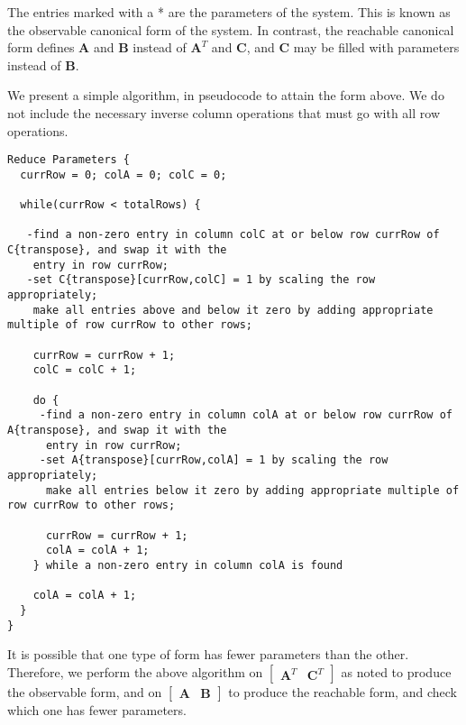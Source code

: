     The entries marked with a * are the parameters of the system.
This is known as the observable canonical form of the system. In
contrast, the reachable canonical form defines $\mathbf{A}$ and
$\mathbf{B}$ instead of $\mathbf{A}^T$ and $\mathbf{C}$, and
$\mathbf{C}$ may be filled with parameters instead of
$\mathbf{B}$.

    We present a simple algorithm, in pseudocode to attain the form
above. We do not include the necessary inverse column operations
that must go with all row operations.

\begin{singlespace}
\vspace{-12pt}
\begin{scriptsize}
\begin{verbatim}
Reduce Parameters {
  currRow = 0; colA = 0; colC = 0;

  while(currRow < totalRows) {

   -find a non-zero entry in column colC at or below row currRow of C{transpose}, and swap it with the
    entry in row currRow;
   -set C{transpose}[currRow,colC] = 1 by scaling the row appropriately;
    make all entries above and below it zero by adding appropriate multiple of row currRow to other rows;

    currRow = currRow + 1;
    colC = colC + 1;

    do {
     -find a non-zero entry in column colA at or below row currRow of A{transpose}, and swap it with the
      entry in row currRow;
     -set A{transpose}[currRow,colA] = 1 by scaling the row appropriately;
      make all entries below it zero by adding appropriate multiple of row currRow to other rows;

      currRow = currRow + 1;
      colA = colA + 1;
    } while a non-zero entry in column colA is found

    colA = colA + 1;
  }
}
\end{verbatim}
\end{scriptsize}
\vspace{-12pt}
\end{singlespace}

    It is possible that one type of form has fewer parameters than the
other. Therefore, we perform the above algorithm on $\left [
\begin{array} {cc} \mathbf{A}^T & \mathbf{C}^T
\end{array} \right ]$ as noted to produce the observable form, and on $\left [
\begin{array} {cc} \mathbf{A} & \mathbf{B} \end{array} \right
]$ to produce the reachable form, and check which one has fewer
parameters.

